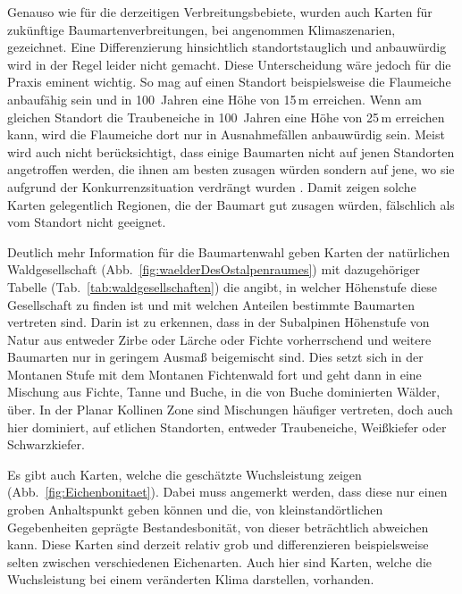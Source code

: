 \documentclass[twocolumn]{scrartcl}
\begin{document}
Genauso wie für die derzeitigen Verbreitungsbebiete, wurden auch
Karten für zukünftige Baumartenverbreitungen, bei angenommen
Klimaszenarien, gezeichnet. Eine Differenzierung hinsichtlich
standortstauglich und anbauwürdig wird in der Regel leider nicht
gemacht. Diese Unterscheidung wäre jedoch für die Praxis eminent
wichtig. So mag auf einen Standort beispielsweise die Flaumeiche
anbaufähig sein und in 100~Jahren eine Höhe von 15\,m erreichen. Wenn
am gleichen Standort die Traubeneiche in 100~Jahren eine Höhe von
25\,m erreichen kann, wird die Flaumeiche dort nur in Ausnahmefällen
anbauwürdig sein. Meist wird auch nicht berücksichtigt, dass einige
Baumarten nicht auf jenen Standorten angetroffen werden, die ihnen am
besten zusagen würden sondern auf jene, wo sie aufgrund der
Konkurrenzsituation verdrängt wurden
\citep{lian2022BaVerbreitungOpt}. Damit zeigen solche Karten
gelegentlich Regionen, die der Baumart gut zusagen würden, fälschlich
als vom Standort nicht geeignet.

Deutlich mehr Information für die Baumartenwahl geben Karten der
natürlichen Waldgesellschaft (Abb.~\ref{fig:waelderDesOstalpenraumes})
mit dazugehöriger Tabelle (Tab.~\ref{tab:waldgesellschaften}) die
angibt, in welcher Höhenstufe diese Gesellschaft zu finden ist und mit
welchen Anteilen bestimmte Baumarten vertreten sind. Darin ist zu
erkennen, dass in der Subalpinen Höhenstufe von Natur aus entweder
Zirbe oder Lärche oder Fichte vorherrschend und weitere Baumarten nur
in geringem Ausmaß beigemischt sind. Dies setzt sich in der Montanen
Stufe mit dem Montanen Fichtenwald fort und geht dann in eine Mischung
aus Fichte, Tanne und Buche, in die von Buche dominierten Wälder,
über. In der Planar Kollinen Zone sind Mischungen häufiger vertreten,
doch auch hier dominiert, auf etlichen Standorten, entweder
Traubeneiche, Weißkiefer oder Schwarzkiefer.

Es gibt auch Karten, welche die geschätzte Wuchsleistung zeigen
(Abb.~\ref{fig:Eichenbonitaet}). Dabei muss angemerkt werden, dass
diese nur einen groben Anhaltspunkt geben können und die, von
kleinstandörtlichen Gegebenheiten geprägte Bestandesbonität, von
dieser beträchtlich abweichen kann. Diese Karten sind derzeit relativ
grob und differenzieren beispielsweise selten zwischen verschiedenen
Eichenarten. Auch hier sind Karten, welche die Wuchsleistung bei einem
veränderten Klima darstellen, vorhanden.
\end{document}
